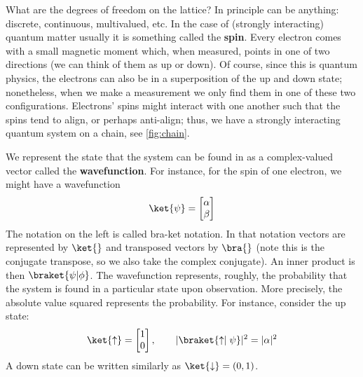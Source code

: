 \documentclass{article}
\begin{document}
What are the degrees of freedom on the lattice? In principle can be anything: 
discrete, continuous, multivalued, etc. In the case of (strongly interacting)
quantum matter usually it is something called the \textbf{spin}. Every electron
comes with a small magnetic moment which, when measured, points in one of two
directions (we can think of them as up or down). Of course, since this is
quantum physics, the electrons can also be in a superposition of the up and down
state; nonetheless, when we make a measurement we only find them in one of these
two configurations. Electrons' spins might interact with one another such that
the spins tend to align, or perhaps anti-align; thus, we have a strongly
interacting quantum system on a chain, see \cref{fig:chain}.

We represent the state that the system can be found in as a complex-valued
vector called the \textbf{wavefunction}. For instance, for the spin of one
electron, we might have a wavefunction 
\begin{equation*}
	\ket{\psi} = \begin{bmatrix}
	\alpha \\ \beta
	\end{bmatrix}
\end{equation*}
The notation on the left is called bra-ket notation. In that notation vectors 
are represented by $ \ket{} $ and transposed vectors by $ \bra{} $ (note this 
is the conjugate transpose, so we also take the complex conjugate). An inner 
product is then $ \braket{\psi\vert\phi} $. The wavefunction represents, roughly, 
the probability that the system is found in a particular state upon observation. More 
precisely, the absolute value squared represents the probability. For instance, 
consider the up state: 
\begin{equation*}
	\ket{\uparrow}= \begin{bmatrix}
	1\\0
	\end{bmatrix},\qquad 
	|\braket{\uparrow\mid\psi}|^2 = |\alpha|^2
\end{equation*}
A down state can be written similarly as $ \ket{\downarrow} = (0, 1) $. 
\end{document}
